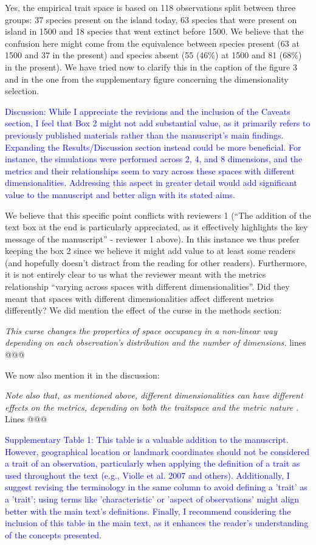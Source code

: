 \documentclass[
]{article}
\begin{document}
Yes, the empirical trait space is based on 118 observations split between three groups: 37 species present on the island today, 63 species that were present on island in 1500 and 18 species that went extinct before 1500.
We believe that the confusion here might come from the equivalence between species present (63 at 1500 and 37 in the present) and species absent (55 (46\%) at 1500 and 81 (68\%) in the present).
We have tried now to clarify this in the caption of the figure 3 and in the one from the supplementary figure concerning the dimensionality selection.

\textcolor{blue}{Discussion: While I appreciate the revisions and the inclusion of the Caveats section, I feel that Box 2 might not add substantial value, as it primarily refers to previously published materials rather than the manuscript's main findings.
Expanding the Results/Discussion section instead could be more beneficial.
For instance, the simulations were performed across 2, 4, and 8 dimensions, and the metrics and their relationships seem to vary across these spaces with different dimensionalities.
Addressing this aspect in greater detail would add significant value to the manuscript and better align with its stated aims.}

We believe that this specific point conflicts with reviewers 1 (``The addition of the text box at the end is particularly appreciated, as it effectively highlights the key message of the manuscript'' - reviewer 1 above).
In this instance we thus prefer keeping the box 2 since we believe it might add value to at least some readers (and hopefully doesn't distract from the reading for other readers).
Furthermore, it is not entirely clear to us what the reviewer meant with the metrics relationship ``varying across spaces with different dimensionalities''.
Did they meant that spaces with different dimensionalities affect different metrics differently?
We did mention the effect of the curse in the methods section:

\textit{This curse changes the properties of space occupancy in a non-linear way depending on each observation's distribution and the number of dimensions.} lines @@@

We now also mention it in the discussion:

\textit{Note also that, as mentioned above, different dimensionalities can have different effects on the metrics, depending on both the traitspace and the metric nature \citep{bellman1957dynamic}.} Lines @@@


\textcolor{blue}{Supplementary Table 1: This table is a valuable addition to the manuscript.
However, geographical location or landmark coordinates should not be considered a trait of an observation, particularly when applying the definition of a trait as used throughout the text (e.g., Violle et al. 2007 and others).
Additionally, I suggest revising the terminology in the same column to avoid defining a 'trait' as a 'trait'; using terms like 'characteristic' or 'aspect of observations' might align better with the main text's definitions.
Finally, I recommend considering the inclusion of this table in the main text, as it enhances the reader's understanding of the concepts presented.}
\end{document}
